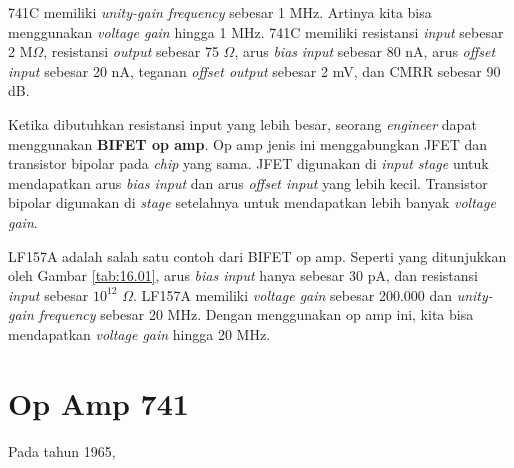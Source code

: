 741C memiliki \textit{unity-gain frequency} sebesar 1 MHz. Artinya kita bisa menggunakan \textit{voltage gain} hingga 1 MHz. 741C memiliki resistansi \textit{input} sebesar 2 M$\Omega$, resistansi \textit{output} sebesar 75 $\Omega$, arus \textit{bias} \textit{input} sebesar 80 nA, arus \textit{offset} \textit{input} sebesar 20 nA, teganan \textit{offset output} sebesar 2 mV, dan CMRR sebesar 90 dB.

Ketika dibutuhkan resistansi input yang lebih besar, seorang \textit{engineer} dapat menggunakan \textbf{BIFET op amp}. Op amp jenis ini menggabungkan JFET dan transistor bipolar pada \textit{chip} yang sama. JFET digunakan di \textit{input stage} untuk mendapatkan arus \textit{bias input} dan arus \textit{offset input} yang lebih kecil. Transistor bipolar digunakan di \textit{stage} setelahnya untuk mendapatkan lebih banyak \textit{voltage gain}.

LF157A adalah salah satu contoh dari BIFET op amp. Seperti yang ditunjukkan oleh Gambar \ref{tab:16.01}, arus \textit{bias input} hanya sebesar 30 pA, dan resistansi \textit{input} sebesar $ 10^{12} $ $\Omega$. LF157A memiliki \textit{voltage gain} sebesar 200.000 dan \textit{unity-gain frequency} sebesar 20 MHz. Dengan menggunakan op amp ini, kita bisa mendapatkan \textit{voltage gain} hingga 20 MHz.


\section{Op Amp 741}

Pada tahun 1965, 